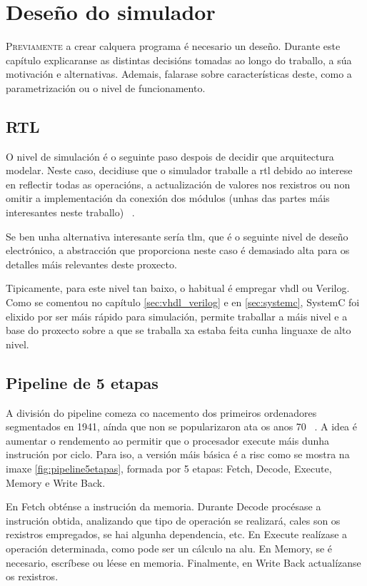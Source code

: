 \chapter{Deseño do simulador}
\label{chap:deseño_simulador}

\lettrine{P}{reviamente} a crear calquera programa é necesario un deseño. Durante este capítulo explicaranse as distintas decisións tomadas ao longo do traballo, a súa motivación e alternativas. Ademais, falarase sobre características deste, como a parametrización ou o nivel de funcionamento.

\section{RTL}\label{sec:rtl}
O nivel de simulación é o seguinte paso despois de decidir que arquitectura modelar. Neste caso, decidiuse que o simulador traballe a \acrshort{rtl} debido ao interese en reflectir todas as operacións, a actualización de valores nos rexistros ou non omitir a implementación da conexión dos módulos (unhas das partes máis interesantes neste traballo) ~\cite{rtl_wikipedia}.

Se ben unha alternativa interesante sería \acrshort{tlm}, que é o seguinte nivel de deseño electrónico, a abstracción que proporciona neste caso é demasiado alta para os detalles máis relevantes deste proxecto.  

Tipicamente, para este nivel tan baixo, o habitual é empregar \acrshort{vhdl} ou Verilog. Como se comentou no capítulo \ref{sec:vhdl_verilog} e en \ref{sec:systemc}, SystemC foi elixido por ser máis rápido para simulación, permite traballar a máis nivel e a base do proxecto sobre a que se traballa xa estaba feita cunha linguaxe de alto nivel.

\section{Pipeline de 5 etapas}\label{sec:pipeline_5etapas}
A división do pipeline comeza co nacemento dos primeiros ordenadores segmentados en 1941, aínda que non se popularizaron ata os anos 70 ~\cite{wiki_segmentacion}. A idea é aumentar o rendemento ao permitir que o procesador execute máis dunha instrución por ciclo. Para iso, a versión máis básica é a \acrfull{risc} como se mostra na imaxe \ref{fig:pipeline5etapas}, formada por 5 etapas: Fetch, Decode, Execute, Memory e Write Back.

En Fetch obténse a instrución da memoria. Durante Decode procésase a instrución obtida, analizando que tipo de operación se realizará, cales son os rexistros empregados, se hai algunha dependencia, etc. En Execute realízase a operación determinada, como pode ser un cálculo na \acrfull{alu}. En Memory, se é necesario, escríbese ou léese en memoria. Finalmente, en Write Back actualízanse os rexistros.

